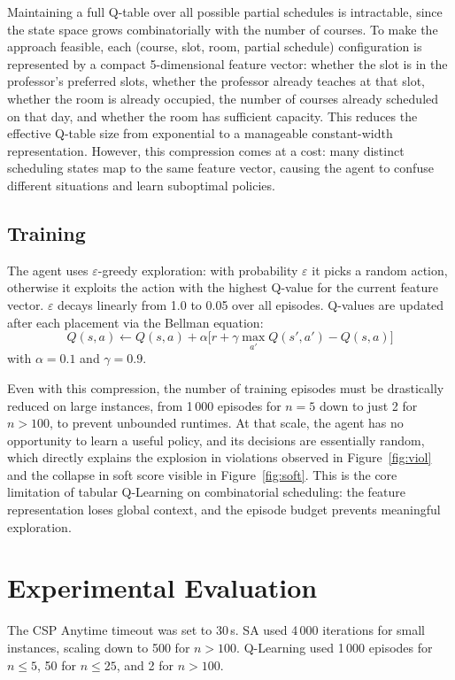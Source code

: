 \documentclass[letterpaper]{article}
\begin{document}
Maintaining a full Q-table over all possible partial schedules is intractable, since the state space grows combinatorially with the number of courses. To make the approach feasible, each (course, slot, room, partial schedule) configuration is represented by a compact 5-dimensional feature vector: whether the slot is in the professor's preferred slots, whether the professor already teaches at that slot, whether the room is already occupied, the number of courses already scheduled on that day, and whether the room has sufficient capacity. This reduces the effective Q-table size from exponential to a manageable constant-width representation. However, this compression comes at a cost: many distinct scheduling states map to the same feature vector, causing the agent to confuse different situations and learn suboptimal policies.

\subsection{Training}

The agent uses $\varepsilon$-greedy exploration: with probability $\varepsilon$ it picks a random action, otherwise it exploits the action with the highest Q-value for the current feature vector. $\varepsilon$ decays linearly from 1.0 to 0.05 over all episodes. Q-values are updated after each placement via the Bellman equation:
\[
Q(s,a) \leftarrow Q(s,a) + \alpha\big[r + \gamma \max_{a'}Q(s',a') - Q(s,a)\big]
\]
with $\alpha = 0.1$ and $\gamma = 0.9$.

Even with this compression, the number of training episodes must be drastically reduced on large instances, from 1\,000 episodes for $n = 5$ down to just 2 for $n > 100$, to prevent unbounded runtimes. At that scale, the agent has no opportunity to learn a useful policy, and its decisions are essentially random, which directly explains the explosion in violations observed in Figure~\ref{fig:viol} and the collapse in soft score visible in Figure~\ref{fig:soft}. This is the core limitation of tabular Q-Learning on combinatorial scheduling: the feature representation loses global context, and the episode budget prevents meaningful exploration.

\section{Experimental Evaluation}
\label{sec:eval}

The CSP Anytime timeout was set to 30\,s. SA used 4\,000 iterations for small instances, scaling down to 500 for $n > 100$. Q-Learning used 1\,000 episodes for $n \leq 5$, 50 for $n \leq 25$, and 2 for $n > 100$.
\end{document}
